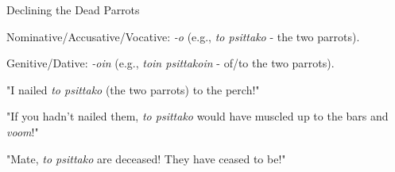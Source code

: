\documentclass[10pt, compress]{beamer}
\begin{document}
\begin{frame}{Declining the Dead Parrots}
  
  
  \begin{narrow_itemize}
    \item Nominative/Accusative/Vocative: \textit{-o} (e.g., \textit{to psittako} - the two parrots).
    \item Genitive/Dative: \textit{-oin} (e.g., \textit{toin psittakoin} - of/to the two parrots).
  \end{narrow_itemize}
  
  \vspace{0.5cm}
  
  
  \begin{narrow_itemize}
    \item {} "I nailed \textit{to psittako} (the two parrots) to the perch!"
    \item {} "If you hadn't nailed them, \textit{to psittako} would have muscled up to the bars and \textit{voom}!"
    \item {} "Mate, \textit{to psittako} are deceased! They have ceased to be!"
  \end{narrow_itemize}

  \vspace{0.5cm}
  
   
  
  \vspace{0.5cm}
\end{frame}


\end{document}
